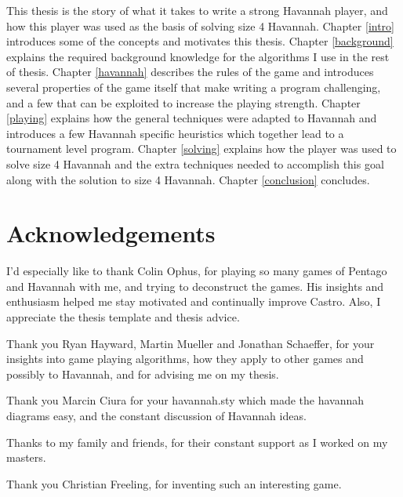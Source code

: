 This thesis is the story of what it takes to write a strong Havannah player, and how this player was used as the basis of solving size 4 Havannah. Chapter \ref{intro} introduces some of the concepts and motivates this thesis. Chapter \ref{background} explains the required background knowledge for the algorithms I use in the rest of thesis. Chapter \ref{havannah} describes the rules of the game and introduces several properties of the game itself that make writing a program challenging, and a few that can be exploited to increase the playing strength. Chapter \ref{playing} explains how the general techniques were adapted to Havannah and introduces a few Havannah specific heuristics which together lead to a tournament level program. Chapter \ref{solving} explains how the player was used to solve size 4 Havannah and the extra techniques needed to accomplish this goal along with the solution to size 4 Havannah. Chapter \ref{conclusion} concludes.



  \newpage
   \chapter*{Acknowledgements}
   \thispagestyle{empty}
   \vspace*{-0.7in}
   \small{

I'd especially like to thank Colin Ophus, for playing so many games of Pentago and Havannah with me, and trying to deconstruct the games. His insights and enthusiasm helped me stay motivated and continually improve Castro. Also, I appreciate the thesis template and thesis advice.

Thank you Ryan Hayward, Martin Mueller and Jonathan Schaeffer, for your insights into game playing algorithms, how they apply to other games and possibly to Havannah, and for advising me on my thesis.

Thank you Marcin Ciura for your havannah.sty which made the havannah diagrams easy, and the constant discussion of Havannah ideas.

Thanks to my family and friends, for their constant support as I worked on my masters.

Thank you Christian Freeling, for inventing such an interesting game.

   }

